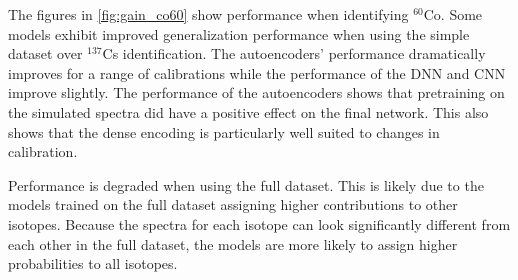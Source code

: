 The figures in \ref{fig:gain_co60} show performance when identifying $^{60}$Co. Some models exhibit improved generalization performance when using the simple dataset over $^{137}$Cs identification. The autoencoders' performance dramatically improves for a range of calibrations while the performance of the DNN and CNN improve slightly. The performance of the autoencoders shows that pretraining on the simulated spectra did have a positive effect on the final network. This also shows that the dense encoding is particularly well suited to changes in calibration.

Performance is degraded when using the full dataset. This is likely due to the models trained on the full dataset assigning higher contributions to other isotopes. Because the spectra for each isotope can look significantly different from each other in the full dataset, the models are more likely to assign higher probabilities to all isotopes.


